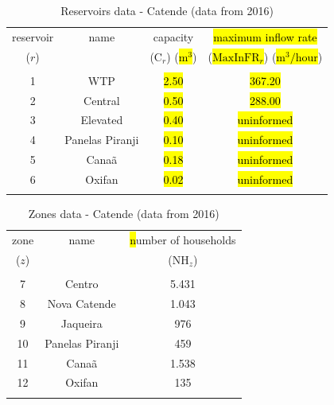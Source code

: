 \documentclass{singlecol}
\theoremstyle{TH}{
\newtheorem{lemma}{Lemma}
\newtheorem{theorem}[lemma]{Theorem}
\newtheorem{corrolary}[lemma]{Corrolary}
\newtheorem{conjecture}[lemma]{Conjecture}
\newtheorem{proposition}[lemma]{Proposition}
\newtheorem{claim}[lemma]{Claim}
\newtheorem{stheorem}[lemma]{Wrong Theorem}
\newtheorem{algorithm}{Algorithm}
}
\theoremstyle{THrm}{
\newtheorem{definition}{Definition}[section]
\newtheorem{question}{Question}[section]
\newtheorem{remark}{Remark}
\newtheorem{scheme}{Scheme}
}
\theoremstyle{THhit}{
\newtheorem{case}{Case}[section]
}
\begin{document}
\begin{table}[H]
\begin{center}
	\begin{tabular}{ c  c  c  c } 
		reservoir      & name              & capacity                       & \hl{maximum inflow rate}    \\
		($r$)          &             	   &  ($\mathrm{C}_{r}$) (\hl{$\mathrm{m^3}$})    &  (\hl{$\mathrm{MaxInFR}_{r}$}) (\hl{$\mathrm{m^3/hour}$}) \\
		\\
		1              & WTP                &   \hl{2.50}            &  \hl{367.20}   \\
		2              & Central             &   \hl{0.50} 		&  \hl{288.00}   \\
		3              & Elevated           &   \hl{0.40}           & \hl{uninformed} \\
		4              & Panelas Piranji  &   \hl{0.10}           & \hl{uninformed} \\
		5              & Canaã              &   \hl{0.18}           & \hl{uninformed} \\
		6              & Oxifan              &   \hl{0.02}            & \hl{uninformed} \\
		\\
	\end{tabular}
\caption{Reservoirs data - Catende (data from 2016)}
\label{tab:reservoirsCatende}
\end{center}
\end{table}

\begin{table}[H]
\begin{center}
	\begin{tabular}{ c  c  c } 
		zone          & name         & \hl{n}umber of households \\
		($z$)          &              & ($\mathrm{NH}_{z}$)   \\
		                                               \\
		7              & Centro           & 5.431 \\
		8              & Nova Catende     & 1.043 \\
		9              & Jaqueira         &   976 \\
	   10              & Panelas Piranji  &   459 \\
	   11              & Canaã            & 1.538 \\
	   12              & Oxifan           &   135 \\
	   \\
	\end{tabular}
\caption{Zones data - Catende (data from 2016)}
\label{tab:zonesCatende}
\end{center}
\end{table}
\end{document}
